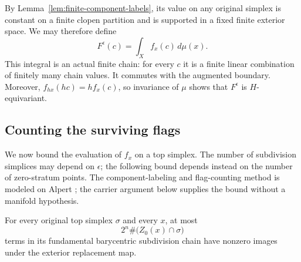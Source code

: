 By Lemma~\ref{lem:finite-component-labels}, its value on any
original simplex is constant on a finite clopen partition and
is supported in a fixed finite exterior space. We may therefore
define
\begin{equation}\label{eq:averaged-chain-map}
 F^\epsilon(c)=\int_X f_x(c)\,d\mu(x).
\end{equation}
This integral is an actual finite chain: for every $c$ it is a
finite linear combination of finitely many chain values.
It commutes with the augmented boundary. Moreover,
$f_{hx}(hc)=h f_x(c)$, so invariance of $\mu$ shows that
$F^\epsilon$ is $H$-equivariant.

\subsection{Counting the surviving flags}

We now bound the evaluation of $f_x$ on a top simplex. The number
of subdivision simplices may depend on $\epsilon$; the following
bound depends instead on the number of zero-stratum points.
The component-labeling and flag-counting method is modeled on
Alpert \cite[Lemmas 4 and 10]{Alpert2025}; the carrier argument below
supplies the bound without a manifold hypothesis.

\begin{lemma}\label{lem:surviving-flags}
For every original top simplex $\sigma$ and every $x$, at most
\[
 2^n\#\bigl(Z_0(x)\cap\sigma\bigr)
\]
terms in its fundamental barycentric subdivision chain have
nonzero images under the exterior replacement map.
\end{lemma}

